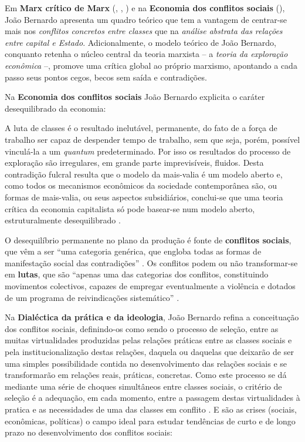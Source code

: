 Em \textbf{Marx crítico de Marx} (\citeyear{BERNARDO1977a}, \citeyear{BERNARDO1977b}, \citeyear{BERNARDO1977c}) e na \textbf{Economia dos conflitos sociais} (\citeyear{BERNARDO1991}), João Bernardo apresenta um quadro teórico que tem a vantagem de centrar-se mais nos \textit{conflitos concretos entre classes} que na \textit{análise abstrata das relações entre capital e Estado}. Adicionalmente, o modelo teórico de João Bernardo, conquanto retenha o núcleo central da teoria marxista -- a \textit{teoria da exploração econômica} --, promove uma crítica global ao próprio marxismo, apontando a cada passo seus pontos cegos, becos sem saída e contradições.

Na \textbf{Economia dos conflitos sociais} João Bernardo explicita o caráter desequilibrado da economia:

\begin{citacao}
A luta de classes é o resultado inelutável, permanente, do fato de a força de trabalho ser capaz de despender tempo de trabalho, sem que seja, porém, possível vinculá-la a um \textit{quantum} predeterminado. Por isso os resultados do processo de exploração são irregulares, em grande parte imprevisíveis, fluidos. Desta contradição fulcral resulta que o modelo da mais-valia é um modelo aberto e, como todos os mecanismos econômicos da sociedade contemporânea são, ou formas de mais-valia, ou seus aspectos subsidiários, conclui-se que uma teoria crítica da economia capitalista só pode basear-se num modelo aberto, estruturalmente desequilibrado \cite[p.~62]{BERNARDO1991}. 
\end{citacao}

O desequilíbrio permanente no plano da produção é fonte de \textbf{conflitos sociais}, que vêm a ser ``uma categoria genérica, que engloba todas as formas de manifestação social das contradições'' \cite[p.~10]{BERNARDO1997}. Os conflitos podem ou não transformar-se em \textbf{lutas}, que são ``apenas uma das categorias dos conflitos, constituindo movimentos colectivos, capazes de empregar eventualmente a violência e dotados de um programa de reivindicações sistemático'' \cite[p.~10]{BERNARDO1997}. 

Na \textbf{Dialéctica da prática e da ideologia}, João Bernardo refina a conceituação dos conflitos sociais, definindo-os como sendo o processo de seleção, entre as muitas virtualidades produzidas pelas relações práticas entre as classes sociais e pela institucionalização destas relações, daquela ou daquelas que deixarão de ser uma simples possibilidade contida no desenvolvimento das relações sociais e se transformarão em relações reais, práticas, concretas. Como este processo se dá mediante uma série de choques simultâneos entre classes sociais, o critério de seleção é a adequação, em cada momento, entre a passagem destas virtualidades à pratica e as necessidades de uma das classes em conflito \cite[p.~31-32]{BERNARDO1991a}. E são as crises (sociais, econômicas, políticas) o campo ideal para estudar tendências de curto e de longo prazo no desenvolvimento dos conflitos sociais:

